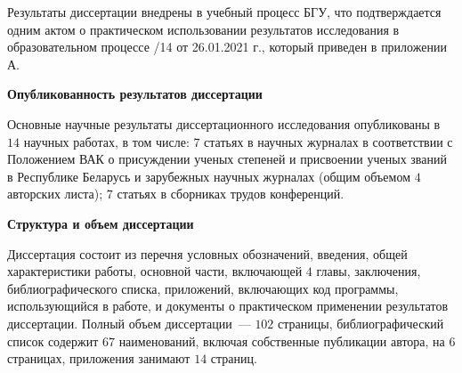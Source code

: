 \documentclass[_00_dissertation.tex]{subfiles}
\begin{document}
Результаты диссертации внедрены в учебный процесс БГУ, что подтверждается одним актом о практическом использовании результатов исследования в образовательном процессе /14 от 26.01.2021 г., который приведен в приложении А.

\pagebreak
\begin{center}
\textbf{Опубликованность результатов диссертации}
\end{center}

Основные научные результаты диссертационного исследования опубликованы в $14$ научных работах, в том числе: $7$ статьях в научных журналах в соответствии с Положением ВАК о присуждении ученых степеней и присвоении ученых званий в Республике Беларусь и зарубежных научных журналах (общим объемом $4$ авторских листа); $7$ статьях в сборниках трудов конференций.

\begin{center}
\textbf{Структура и объем диссертации}
\end{center}

Диссертация состоит из перечня условных обозначений, введения, общей характеристики работы, основной части, включающей $4$ главы, заключения, библиографического списка, приложений, включающих код программы, использующийся в работе, и документы о практическом применении результатов диссертации.
Полный объем диссертации~--- $102$ страницы, библиографический список содержит $67$ наименований, включая собственные публикации автора, на $6$ страницах, приложения занимают $14$ страниц.

\onlyinsubfile{
    
}
\end{document}
